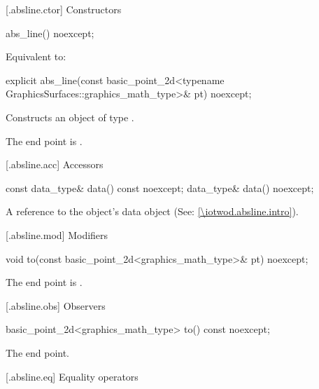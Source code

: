  [\iotwod.absline.ctor] {Constructors}%

%
\begin{itemdecl}
abs_line() noexcept;
\end{itemdecl}
\begin{itemdescr}
\pnum
\effects Equivalent to: 
\end{itemdescr}

%
\begin{itemdecl}
explicit abs_line(const basic_point_2d<typename
  GraphicsSurfaces::graphics_math_type>& pt) noexcept;
\end{itemdecl}
\begin{itemdescr}
\pnum
\effects Constructs an object of type .

\pnum
\remarks The end point is .
\end{itemdescr}

 [\iotwod.absline.acc] {Accessors}%

%
\begin{itemdecl}
const data_type& data() const noexcept;
data_type& data() noexcept;
\end{itemdecl}
\begin{itemdescr}
\pnum
\returns A reference to the  object's data object (See: \ref{\iotwod.absline.intro}).
\end{itemdescr}

 [\iotwod.absline.mod] {Modifiers}%

%
\begin{itemdecl}
void to(const basic_point_2d<graphics_math_type>& pt) noexcept;
\end{itemdecl}
\begin{itemdescr}
\pnum
\effects The end point is .
\end{itemdescr}

 [\iotwod.absline.obs] {Observers} 

%
\begin{itemdecl}
basic_point_2d<graphics_math_type> to() const noexcept;
\end{itemdecl}
\begin{itemdescr}
\pnum
\returns The end point.
\end{itemdescr}

 [\iotwod.absline.eq] {Equality operators}%

